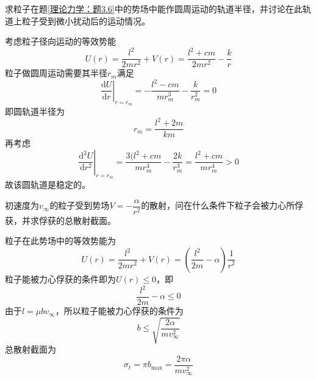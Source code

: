 \begin{question}[98页3.7]
求粒子在题\ref{理论力学：题3.6}中的势场中能作圆周运动的轨道半径，并讨论在此轨道上粒子受到微小扰动后的运动情况。
\end{question}
\begin{solution}
考虑粒子径向运动的等效势能
\begin{equation*}
	U(r) = \frac{l^2}{2mr^2} + V(r) = \frac{l^2+cm}{2mr^2} - \frac{k}{r}
\end{equation*}
粒子做圆周运动需要其半径$r_m$满足
\begin{equation*}
	\left.\frac{\mathrm{d} U}{\mathrm{d} r}\right|_{r=r_m} = -\frac{l^2-cm}{mr_m^3} - \frac{k}{r_m^2} = 0
\end{equation*}
即圆轨道半径为
\begin{equation*}
	r_m = \frac{l^2+2m}{km}
\end{equation*}
再考虑
\begin{equation*}
	\left.\frac{\mathrm{d}^2 U}{\mathrm{d} r^2}\right|_{r=r_m} = \frac{3(l^2+cm}{mr_m^4} - \frac{2k}{r_m^3} = \frac{l^2+cm}{mr_m^4} > 0
\end{equation*}
故该圆轨道是稳定的。
\end{solution}

\begin{question}[98页3.16]
初速度为$v_\infty$的粒子受到势场$V=-\dfrac{\alpha}{r^2}$的散射，问在什么条件下粒子会被力心所俘获，并求俘获的总散射截面。
\end{question}
\begin{solution}
粒子在此势场中的等效势能为
\begin{equation*}
	U(r) = \frac{l^2}{2mr^2} + V(r) = \left(\frac{l^2}{2m}-\alpha\right) \frac{1}{r^2}
\end{equation*}
粒子能被力心俘获的条件即为$U(r) \leqslant 0$，即
\begin{equation*}
	\frac{l^2}{2m}-\alpha \leqslant 0
\end{equation*}
由于$l = \mu b v_\infty$，所以粒子能被力心俘获的条件为
\begin{equation*}
	b \leqslant \sqrt{\frac{2\alpha}{mv_\infty^2}}
\end{equation*}
总散射截面为
\begin{equation*}
	\sigma_t = \pi b_{\max} = \frac{2\pi\alpha}{mv_\infty^2}
\end{equation*}
\end{solution}

